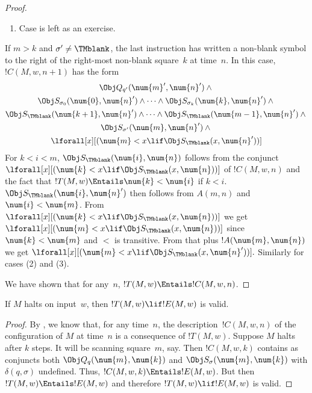 \documentclass[../../../include/open-logic-section]{subfiles}
\begin{document}
\begin{proof}
\begin{enumerate}
\item Case  is left as an exercise.
\end{enumerate}
If $m > k$ and $\sigma' \neq \TMblank$, the last instruction has
written a non-blank symbol to the right of the right-most non-blank
square~$k$ at time~$n$. In this case, $!C(M, w, n+1)$ has the form
\begin{multline*}
\Obj Q_{q'}(\num{m}', \num{n}') \land {}\\
\Obj S_{\sigma_0}(\num{0}, \num{n}') \land \dots \land
\Obj S_{\sigma_k}(\num{k}, \num{n}') \land {}\\
\Obj S_{\TMblank}(\num{k+1}, \num{n}') \land \dots \land
\Obj S_{\TMblank}(\num{m-1}, \num{n}') \land {}\\
\Obj S_{\sigma'}(\num{m},
\num{n}') \land {}\\
\lforall[x][(\num{m} < x
  \lif \Obj S_\TMblank(x, \num{n}'))]
\end{multline*}
For $k < i < m$, $\Obj S_{\TMblank}(\num{i}, \num{n})$ follows from
the conjunct $\lforall[x][(\num{k} < x \lif \Obj S_\TMblank(x,
  \num{n}))]$ of $!C(M, w, n)$ and the fact that $!T(M, w) \Entails
\num{k} < \num{i}$ if $k < i$. $\Obj S_{\TMblank}(\num{i}, \num{n}')$
then follows from $A(m, n)$ and $\num{i} < \num{m}$.  From
$\lforall[x][(\num{k} < x \lif \Obj S_\TMblank(x, \num{n}))]$ we get
$\lforall[x][(\num{m} < x \lif \Obj S_\TMblank(x, \num{n}))]$ since
$\num{k}<\num{m}$ and $<$ is transitive.  From that plus $!A(\num{m},
\num{n})$ we get $\lforall[x][(\num{m} < x \lif \Obj S_\TMblank(x,
  \num{n}'))].$ Similarly for cases (2) and (3).

We have shown that for any~$n$, $!T(M, w) \Entails !C(M, w, n)$.
\end{proof}

\begin{lem}
If $M$ halts on input~$w$, then $!T(M, w) \lif
!E(M, w)$ is valid.
\end{lem}

\begin{proof}
By , we know that, for any time~$n$, the
description~$!C(M, w, n)$ of the configuration of $M$ at time~$n$ is a
consequence of $!T(M, w)$.  Suppose $M$ halts after $k$ steps. It will
be scanning square~$m$, say. Then $!C(M, w, k)$ contains as conjuncts
both $\Obj Q_q(\num{m}, \num{k})$ and $\Obj S_\sigma(\num{m},
\num{k})$ with $\delta(q,\sigma)$ undefined. Thus, $!C(M, w, k)
\Entails !E(M, w)$. But then $!T(M, w) \Entails !E(M, w)$ and
therefore $!T(M, w) \lif !E(M, w)$ is valid.
\end{proof}
\end{document}
